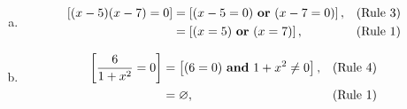 \documentclass[12pt,fleqn]{article}
\newcounter{eq}
\newenvironment{alphalist}{
  \begin{enumerate}[(a)]
    \addtolength{\itemsep}{-0.5\itemsep}}
  {\end{enumerate}}
\newcommand{\textor}{ \mbox{ \textbf{or} }}
\newcommand{\textand}{ \mbox{ \textbf{and} }}
\begin{document}

\begin{alphalist}
\item \begin{align*}
  \left[(x-5)(x-7) = 0 \right] &= 
      \left[(x-5=0) \textor (x-7=0) \right], &\mbox{(Rule 3)} \\
      &= \left[(x=5) \textor (x=7) \right], &\mbox{(Rule 1)} \\
\end{align*}
\item \begin{align*}
  \left[\dfrac{6}{1+x^2} = 0 \right] &= 
      \left[(6=0) \textand 1+x^2 \neq 0 \right], &\mbox{(Rule 4)} \\
      &= \varnothing, &\mbox{(Rule 1)} \\
\end{align*}
\end{alphalist}
\end{document}
